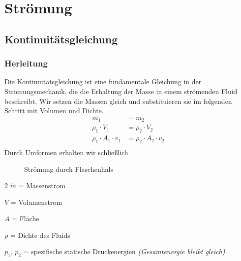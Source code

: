 \documentclass[a4paper,11pt,twoside]{article}
\begin{document}
\section{Strömung}

\subsection{Kontinuitätsgleichung}
\subsubsection{Herleitung}
Die Kontinuitätsgleichung ist eine fundamentale Gleichung in der Strömungsmechanik, die die Erhaltung der Masse in einem strömenden Fluid beschreibt.
\pp
Wir setzen die Massen gleich und substituieren sie im folgenden Schritt mit Volumen und Dichte.
\begin{align*}
m_1 &= m_2  \\
\rho_1 \cdot V_1 &= \rho_2 \cdot V_2  \\
\rho_1 \cdot A_1 \cdot v_1 &= \rho_2 \cdot A_2 \cdot v_2 \\
\end{align*}
Durch Umformen erhalten wir schließlich

\pp
\begin{figure}[h]
\centering
{}
\caption{Strömung durch Flaschenhals}
\end{figure}

\begin{multicols}{2}
$\dot{m}$ = Massenstrom  \par 
$V$ = Volumenstrom  \par
$A$ = Fläche \par
$\rho$ = Dichte des Fluids \par
$p_1$, $p_2$ = spezifische statische Druckenergien \textit{(Gesamtenergie bleibt gleich)} \par
\end{multicols}
 \pp
\end{document}

